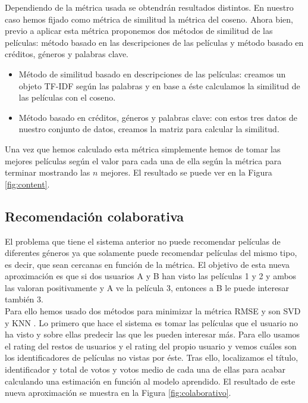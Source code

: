 			Dependiendo de la métrica usada se obtendrán resultados distintos. En nuestro caso hemos fijado como métrica de similitud la métrica del coseno. Ahora bien, previo a aplicar esta métrica proponemos dos métodos de similitud de las películas: método basado en las descripciones de las películas y método basado en créditos, géneros y palabras clave.
			
			\begin{itemize}
				\item Método de similitud basado en descripciones de las películas: creamos un objeto TF-IDF según las palabras y en base a éste calculamos la similitud de las películas con el coseno.
				\item Método basado en créditos, géneros y palabras clave: con estos tres datos de nuestro conjunto de datos, creamos la matriz para calcular la similitud.
			\end{itemize}
		
		
			Una vez que hemos calculado esta métrica simplemente hemos de tomar las mejores películas según el valor para cada una de ella según la métrica para terminar mostrando las $n$ mejores. El resultado se puede ver en la Figura \ref{fig:content}.
			
		\subsection{Recomendación colaborativa}
		
			El problema que tiene el sistema anterior no puede recomendar películas de diferentes géneros ya que solamente puede recomendar películas del mismo tipo, es decir, que sean cercanas en función de la métrica. El objetivo de esta nueva aproximación es que si dos usuarios A y B han visto las películas 1 y 2 y ambos las valoran positivamente y A ve la película 3, entonces a B le puede interesar también 3. \\
			
			Para ello hemos usado dos métodos para minimizar la métrica RMSE y son SVD y KNN \cite{c2}. Lo primero que hace el sistema es tomar las películas que el usuario no ha visto y sobre ellas predecir las que les pueden interesar más. Para ello usamos el rating del restos de usuarios y el rating del propio usuario y vemos cuáles son los identificadores de películas no vistas por éste. Tras ello, localizamos el título, identificador y total de votos y votos medio de cada una de ellas para acabar calculando una estimación en función al modelo aprendido. El resultado de este nueva aproximación se muestra en la Figura \ref{fig:colaborativo}. \\
			
